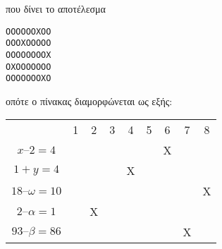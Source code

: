 που δίνει το αποτέλεσμα
\begin{lstlisting}
OOOOOOXOO
OOOXOOOOO
OOOOOOOOX
OXOOOOOOO
OOOOOOOXO
\end{lstlisting}
οπότε ο πίνακας διαμορφώνεται ως εξής:
\begin{tabular}{|c|c|c|c|c|c|c|c|c|}
&1&2&3&4&5&6&7&8\\
$x – 2 = 4$&&&&&&Χ&&\\
$1 + y = 4$&&&&Χ&&&&\\
$18 – \omega = 10$&&&&&&&&Χ\\
$2 – \alpha = 1$&&Χ&&&&&&\\
$93 – \beta = 86$&&&&&&&Χ&\\
\end{tabular}

